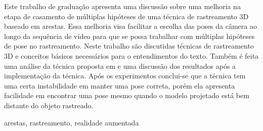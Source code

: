 \resumo
Este trabalho de graduação apresenta uma discussão sobre uma melhoria na etapa de casamento de múltiplas hipóteses de uma técnica de rastreamento 3D baseado em arestas. Essa melhoria visa facilitar a escolha das poses da câmera ao longo da sequência de vídeo para que se possa trabalhar com múltiplas hipóteses de pose no rastreamento. Neste trabalho são discutidas técnicas de rastreamento 3D e conceitos básicos necessários para o entendimentos do texto. Também é feita uma análise da técnica proposta em \cite{celine} e uma discussão dos resultados após a implementação da técnica. Após os experimentos conclui-se que a técnica tem uma certa instabilidade em manter uma pose correta, porém ela apresenta facilidade em encontrar uma pose mesmo quando o modelo projetado está bem distante do objeto rastreado.
\begin{keywords}
arestas, rastreamento, realidade aumentada
\end{keywords}


